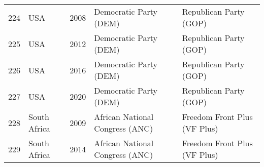 \documentclass[12pt]{article}
\begin{document}
\begin{table}[ht]
\begin{footnotesize}
\begin{tabular}{rllll}
  224 &  USA  & 2008 &   Democratic Party (DEM) &   Republican Party (GOP) \\ 
  225 &  USA  & 2012 &   Democratic Party (DEM) &   Republican Party (GOP) \\ 
  226 &  USA  & 2016 &   Democratic Party (DEM) &   Republican Party (GOP) \\ 
  227 &  USA  & 2020 &   Democratic Party (DEM) &   Republican Party (GOP) \\ 
  228 & South Africa & 2009 &   African National Congress (ANC) &   Freedom Front Plus (VF Plus) \\ 
  229 & South Africa & 2014 &   African National Congress (ANC) &   Freedom Front Plus (VF Plus) \\ 
 \hline
\end{tabular}
   \end{footnotesize}
\end{table}
\end{document}
